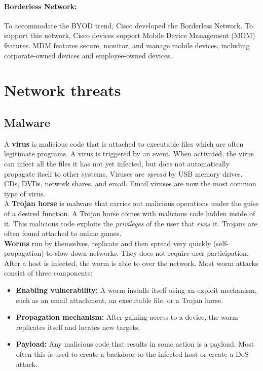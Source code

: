 \paragraph{Borderless Network:} To accommodate the BYOD trend, Cisco developed the Borderless Network. To support this network, Cisco devices support Mobile Device Management (MDM) features. MDM features secure, monitor, and manage mobile devices, including corporate-owned devices and employee-owned devices. 

\section{Network threats}

\subsection{Malware}

A \textbf{virus} is malicious code that is attached to executable files which are often legitimate programs. A virus is triggered by an event. When activated, the virus can infect all the files it has not yet infected, but does not automatically propagate itself to other systems. Viruses are \emph{spread} by USB memory drives, CDs, DVDs, network shares, and email. Email viruses are now the most common type of virus.\\

A \textbf{Trojan horse} is malware that carries out malicious operations under the guise of a desired function. A Trojan horse comes with malicious code hidden inside of it. This malicious code exploits the \emph{privileges} of the user that \emph{runs} it. Trojans are often found attached to online games. \\

\textbf{Worms} run by themselves, replicate and then spread very quickly (self-propagation) to slow down networks. They does not require user participation. After a host is infected, the worm is able to  over the network. Most worm attacks consist of three components:

\begin{itemize}
\item \textbf{Enabling vulnerability:} A worm installs itself using an exploit mechanism, such as an email attachment, an executable file, or a Trojan horse.
\item \textbf{Propagation mechanism:} After gaining access to a device, the worm replicates itself and locates new targets.
\item \textbf{Payload:} Any malicious code that results in some action is a payload. Most often this is used to create a backdoor to the infected host or create a DoS attack.
\end{itemize}


